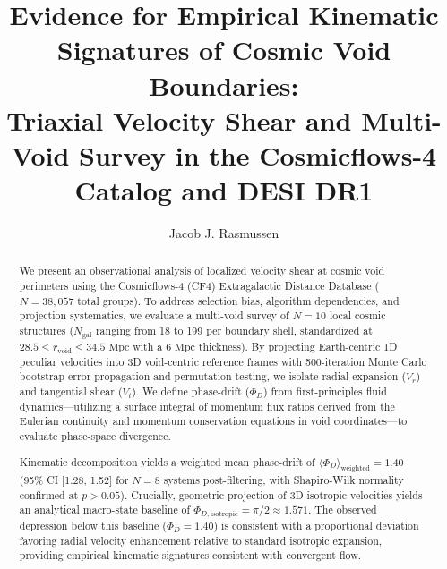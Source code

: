 \documentclass[trackchanges]{aastex631}
\begin{document}
\title{Evidence for Empirical Kinematic Signatures of Cosmic Void Boundaries:\\Triaxial Velocity Shear and Multi-Void Survey in the Cosmicflows-4 Catalog and DESI DR1}

\author[0000-0000-0000-0000]{Jacob J. Rasmussen}


\begin{abstract}
We present an observational analysis of localized velocity shear at cosmic void perimeters using the Cosmicflows-4 (CF4) Extragalactic Distance Database ($N=38,057$ total groups). To address selection bias, algorithm dependencies, and projection systematics, we evaluate a multi-void survey of $N=10$ local cosmic structures ($N_{\text{gal}}$ ranging from 18 to 199 per boundary shell, standardized at $28.5 \le r_{\text{void}} \le 34.5\text{ Mpc}$ with a $6\text{ Mpc}$ thickness). By projecting Earth-centric 1D peculiar velocities into 3D void-centric reference frames with 500-iteration Monte Carlo bootstrap error propagation and permutation testing, we isolate radial expansion ($V_r$) and tangential shear ($V_t$). We define phase-drift ($\Phi_D$) from first-principles fluid dynamics---utilizing a surface integral of momentum flux ratios derived from the Eulerian continuity and momentum conservation equations in void coordinates---to evaluate phase-space divergence. 

Kinematic decomposition yields a weighted mean phase-drift of $\langle\Phi_D\rangle_{\text{weighted}} = 1.40$ (95\% CI [1.28, 1.52] for $N=8$ systems post-filtering, with Shapiro-Wilk normality confirmed at $p > 0.05$). Crucially, geometric projection of 3D isotropic velocities yields an analytical macro-state baseline of $\Phi_{D,\text{isotropic}} = \pi/2 \approx 1.571$. The observed depression below this baseline ($\Phi_D = 1.40$) is consistent with a proportional deviation favoring radial velocity enhancement relative to standard isotropic expansion, providing empirical kinematic signatures consistent with convergent flow. 


\end{abstract}
\end{document}
